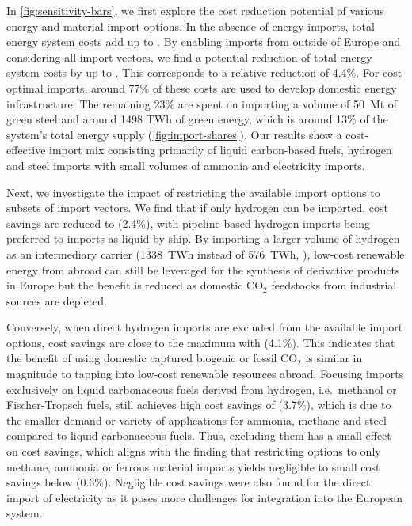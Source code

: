 In \cref{fig:sensitivity-bars}, we first explore the cost reduction potential of
various energy and material import options. In the absence of energy imports,
total energy system costs add up to . By enabling imports from
outside of Europe and considering all import vectors, we find a potential
reduction of total energy system costs by up to . This corresponds to
a relative reduction of 4.4\%. For cost-optimal imports, around 77\% of these
costs are used to develop domestic energy infrastructure. The remaining 23\% are
spent on importing a volume of 50~Mt of green steel and around 1498 TWh of green
energy, which is around 13\% of the system's total energy supply
(\cref{fig:import-shares}). Our results show a cost-effective import mix
consisting primarily of liquid carbon-based fuels, hydrogen and steel imports
with small volumes of ammonia and electricity imports.

Next, we investigate the impact of restricting the available import options to
subsets of import vectors. We find that if only hydrogen can be imported, cost
savings are reduced to  (2.4\%), with pipeline-based hydrogen imports
being preferred to imports as liquid by ship. By importing a larger volume of
hydrogen as an intermediary carrier (1338~TWh instead of 576~TWh,
), low-cost renewable energy from abroad can
still be leveraged for the synthesis of derivative products in Europe but the
benefit is reduced as domestic CO$_2$ feedstocks from industrial sources are
depleted.

Conversely, when direct hydrogen imports are excluded from the available import
options, cost savings are close to the maximum with  (4.1\%). This
indicates that the benefit of using domestic captured biogenic or fossil CO$_2$
is similar in magnitude to tapping into low-cost renewable resources abroad.
Focusing imports exclusively on liquid carbonaceous fuels derived from hydrogen,
i.e.~methanol or Fischer-Tropsch fuels, still achieves high cost savings of
 (3.7\%), which is due to the smaller demand or variety of
applications for ammonia, methane and steel compared to liquid carbonaceous
fuels. Thus, excluding them has a small effect on cost savings, which aligns
with the finding that restricting options to only methane, ammonia or ferrous
material imports yields negligible to small cost savings below 
(0.6\%). Negligible cost savings were also found for the direct import of
electricity as it poses more challenges for integration into the European
system.

